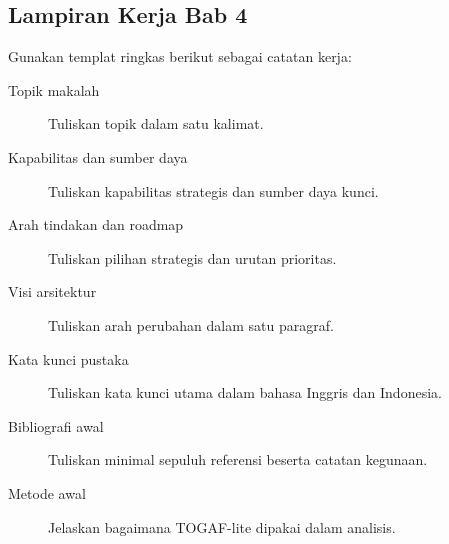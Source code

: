 \subsection*{Lampiran Kerja Bab 4}

Gunakan templat ringkas berikut sebagai catatan kerja:

\begin{description}
  \item[Topik makalah] Tuliskan topik dalam satu kalimat.
  \item[Kapabilitas dan sumber daya] Tuliskan kapabilitas strategis dan sumber
        daya kunci.
  \item[Arah tindakan dan roadmap] Tuliskan pilihan strategis dan urutan
        prioritas.
  \item[Visi arsitektur] Tuliskan arah perubahan dalam satu paragraf.
  \item[Kata kunci pustaka] Tuliskan kata kunci utama dalam bahasa Inggris dan
        Indonesia.
  \item[Bibliografi awal] Tuliskan minimal sepuluh referensi beserta catatan
        kegunaan.
  \item[Metode awal] Jelaskan bagaimana TOGAF-lite dipakai dalam analisis.
\end{description}
\setlength{\emergencystretch}{0pt}
